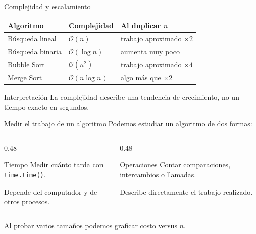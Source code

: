 \documentclass[10pt]{beamer}
\begin{document}
\begin{frame}{Complejidad y escalamiento}
  \begin{center}
    \begin{tabular}{lll}
      \toprule
      Algoritmo & Complejidad & Al duplicar \(n\) \\
      \midrule
      Búsqueda lineal & \(\mathcal{O}(n)\) & trabajo aproximado \(\times 2\) \\
      Búsqueda binaria & \(\mathcal{O}(\log n)\) & aumenta muy poco \\
      Bubble Sort & \(\mathcal{O}(n^2)\) & trabajo aproximado \(\times 4\) \\
      Merge Sort & \(\mathcal{O}(n\log n)\) & algo más que \(\times 2\) \\
      \bottomrule
    \end{tabular}
  \end{center}

  \begin{alertblock}{Interpretación}
    La complejidad describe una tendencia de crecimiento, no un tiempo exacto en segundos.
  \end{alertblock}
\end{frame}

\begin{frame}{Medir el trabajo de un algoritmo}
  Podemos estudiar un algoritmo de dos formas:

  \begin{columns}
    \begin{column}{0.48\textwidth}
      \begin{block}{Tiempo}
        Medir cuánto tarda con \texttt{time.time()}.

        Depende del computador y de otros procesos.
      \end{block}
    \end{column}
    \begin{column}{0.48\textwidth}
      \begin{block}{Operaciones}
        Contar comparaciones, intercambios o llamadas.

        Describe directamente el trabajo realizado.
      \end{block}
    \end{column}
  \end{columns}

  \vspace{0.4cm}
  Al probar varios tamaños podemos graficar costo versus \(n\).
\end{frame}
\end{document}
